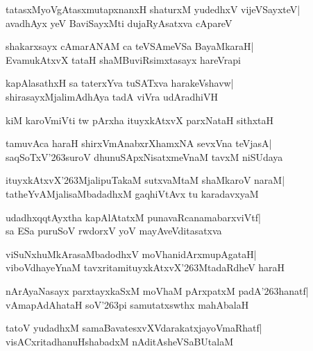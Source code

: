 \documentclass[twoside,12pt,openright]{book}
\def\S{\char'263}
\newcounter{shloka}[chapter]
\begin{document}
\begin{shloka}%
tatasxMyoVgAtasxmutapxnanxH shaturxM yudedhxV vijeVSayxteV|\\
avadhAyx yeV BaviSayxMti dujaRyAsatxva cApareV 
\end{shloka}

\begin{shloka}%
shakarxsayx cAmarANAM ca teVSAmeVSa BayaMkaraH|\\
EvamukAtxvX tataH shaMBuviRsimxtasayx hareVrapi
\end{shloka}

\begin{shloka}%
kapAlasathxH sa taterxYva tuSATxva harakeVshavw|\\
shirasayxMjalimAdhAya tadA viVra udAradhiVH
\end{shloka}

\begin{shloka}%
kiM karoVmiVti tw pArxha ituyxkAtxvX parxNataH sithxtaH
\end{shloka}

\begin{shloka}%
tamuvAca haraH shirxVmAnabxrXhamxNA sevxVna teVjasA|\\
saqSoTxV\S suroV dhunuSApxNisatxmeVnaM tavxM niSUdaya
\end{shloka}

\begin{shloka}%
ituyxkAtxvX\S MjalipuTakaM sutxvaMtaM shaMkaroV naraM|\\
tatheYvAMjalisaMbadadhxM gaqhiVtAvx tu karadavxyaM
\end{shloka}

\begin{shloka}%
udadhxqqtAyxtha kapAlAtatxM punavaRcanamabarxviVtf|\\
sa ESa puruSoV rwdorxV yoV mayAveVditasatxva
\end{shloka}

\begin{shloka}%
viSuNxhuMkArasaMbadodhxV moVhanidArxmupAgataH|\\
viboVdhayeYnaM tavxritamituyxkAtxvX\S MtadaRdheV haraH
\end{shloka}

\begin{shloka}%
nArAyaNasayx parxtayxkaSxM moVhaM pArxpatxM padA\S hanatf|\\
vAmapAdAhataH soV\S pi samutatxswthx mahAbalaH
\end{shloka}

\begin{shloka}%
tatoV yudadhxM samaBavatesxvXVdarakatxjayoVmaRhatf|\\
visACxritadhanuHshabadxM nAditAsheVSaBUtalaM 
\end{shloka}
\end{document}
